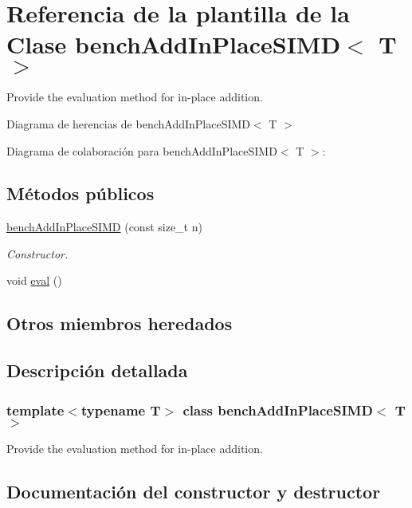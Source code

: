 \hypertarget{classbenchAddInPlaceSIMD}{}\section{Referencia de la plantilla de la Clase bench\+Add\+In\+Place\+S\+I\+MD$<$ T $>$}
\label{classbenchAddInPlaceSIMD}


Provide the evaluation method for in-\/place addition.  




Diagrama de herencias de bench\+Add\+In\+Place\+S\+I\+MD$<$ T $>$


Diagrama de colaboración para bench\+Add\+In\+Place\+S\+I\+MD$<$ T $>$\+:
\subsection*{Métodos públicos}
\begin{DoxyCompactItemize}
\item 
\hyperlink{classbenchAddInPlaceSIMD_ad5a2c04daf59dc62c9a3ba97a1fe7313}{bench\+Add\+In\+Place\+S\+I\+MD} (const size\+\_\+t n)
\begin{DoxyCompactList}\small\item\em Constructor. \end{DoxyCompactList}\item 
void \hyperlink{classbenchAddInPlaceSIMD_aa04d03bcde9283288002bf6045e052f8}{eval} ()
\end{DoxyCompactItemize}
\subsection*{Otros miembros heredados}


\subsection{Descripción detallada}
\subsubsection*{template$<$typename T$>$\newline
class bench\+Add\+In\+Place\+S\+I\+M\+D$<$ T $>$}

Provide the evaluation method for in-\/place addition. 

\subsection{Documentación del constructor y destructor}
\mbox{\label{classbenchAddInPlaceSIMD_ad5a2c04daf59dc62c9a3ba97a1fe7313}} 
